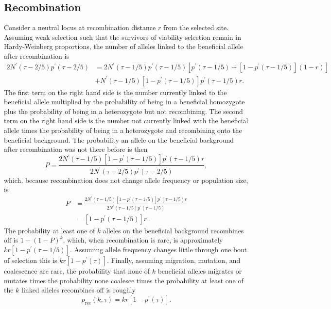 \documentclass[]{article}
\begin{document}
\subsection*{Recombination}
%
Consider a neutral locus at recombination distance $r$ from the selected site.
Assuming weak selection such that the survivors of viability selection remain in Hardy-Weinberg proportions, the number of alleles linked to the beneficial allele after recombination is
\begin{equation}
\begin{aligned}
2 N^\prime(\tau-2/5) p^\prime(\tau-2/5) &= 2 N^\prime(\tau-1/5) p^\prime(\tau-1/5) \left[p^\prime(\tau-1/5) + \left[1-p^\prime(\tau-1/5) \right] (1-r) \right]\\
 &+  N^\prime(\tau-1/5) [1-p^\prime(\tau-1/5)] p^\prime(\tau-1/5) r.
\end{aligned}
\end{equation}
The first term on the right hand side is the number currently linked to the beneficial allele multiplied by the probability of being in a beneficial homozygote plus the probability of being in a heterozygote but not recombining.
The second term on the right hand side is the number not currently linked with the beneficial allele times the probability of being in a heterozygote and recombining onto the beneficial background.
%
The probability an allele on the beneficial background after recombination was not there before is then
\begin{equation}
P = \frac{2 N^\prime(\tau-1/5) [1-p^\prime(\tau-1/5)] p^\prime(\tau-1/5) r}{2 N^\prime(\tau-2/5) p^\prime(\tau-2/5)},
\end{equation}
which, because recombination does not change allele frequency or population size, is
\begin{equation}
\begin{aligned}
P &= \frac{2 N^\prime(\tau-1/5) [1-p^\prime(\tau-1/5)] p^\prime(\tau-1/5) r}{2 N^\prime(\tau-1/5) p^\prime(\tau-1/5)}\\
&= [1-p^\prime(\tau-1/5)] r.
\end{aligned}
\end{equation}
The probability at least one of $k$ alleles on the beneficial background recombines off is $1-(1-P)^k$, which, when recombination is rare, is approximately $k r [1-p^\prime(\tau-1/5)]$.
Assuming allele frequency changes little through one bout of selection this is $k r [1-p^\prime(\tau)]$.
Finally, assuming migration, mutation, and coalescence are rare, the probability that none of $k$ beneficial alleles migrates or mutates times the probability none coalesce times the probability at least one of the $k$ linked alleles recombines off is roughly \citep[table 1 in][]{hudson1988coalescent}
\begin{equation}
p_\mathrm{rec}(k,\tau) = k r [1-p^\prime(\tau)].
\end{equation}
\end{document}
